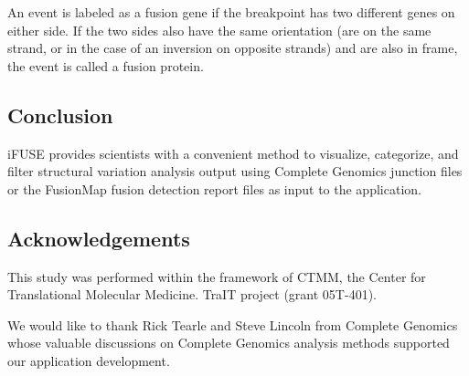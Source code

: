 An event is labeled as a fusion gene if the breakpoint has two different genes on either side. If the two sides also have the same orientation (are on the same strand, or in the case of an inversion on opposite strands) and are also in frame, the event is called a fusion protein.

\subsection*{Conclusion}

iFUSE provides scientists with a convenient method to visualize, categorize, and filter structural variation analysis output using Complete Genomics junction files or the FusionMap fusion detection report files as input to the application.

\subsection*{Acknowledgements}

This study was performed within the framework of CTMM, the Center for Translational Molecular Medicine. TraIT project (grant 05T-401).

We would like to thank Rick Tearle and Steve Lincoln from Complete Genomics whose valuable discussions on Complete Genomics analysis methods supported our application development.


